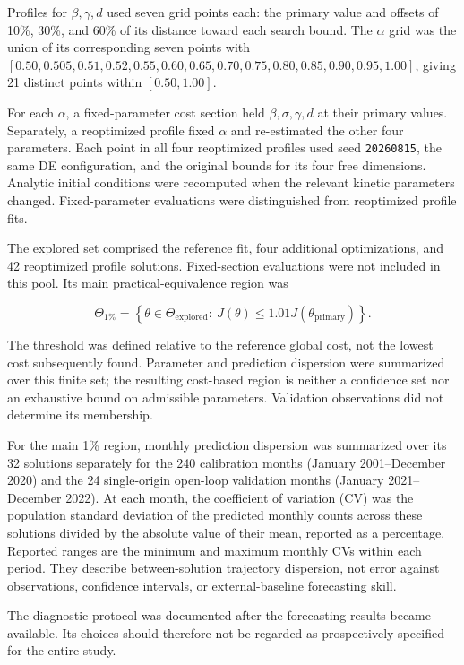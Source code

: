 \documentclass[pdflatex,sn-mathphys-ay,lineno]{sn-jnl}
\begin{document}
Profiles for $\beta,\gamma,d$ used seven grid points each: the primary value and offsets of 10\%, 30\%, and 60\% of its distance toward each search bound. The $\alpha$ grid was the union of its corresponding seven points with $[0.50,0.505,0.51,0.52,0.55,0.60,0.65,0.70,0.75,0.80,0.85,0.90,0.95,1.00]$, giving 21 distinct points within $[0.50,1.00]$.

For each $\alpha$, a fixed-parameter cost section held $\beta,\sigma,\gamma,d$ at their primary values. Separately, a reoptimized profile fixed $\alpha$ and re-estimated the other four parameters. Each point in all four reoptimized profiles used seed \texttt{20260815}, the same DE configuration, and the original bounds for its four free dimensions. Analytic initial conditions were recomputed when the relevant kinetic parameters changed. Fixed-parameter evaluations were distinguished from reoptimized profile fits.

The explored set comprised the reference fit, four additional optimizations, and 42 reoptimized profile solutions. Fixed-section evaluations were not included in this pool. Its main practical-equivalence region was

\[
\Theta_{1\%}=\left\{\theta\in\Theta_{\mathrm{explored}}:\ J(\theta)\le1.01J(\theta_{\mathrm{primary}})\right\}.
\]

The threshold was defined relative to the reference global cost, not the lowest cost subsequently found. Parameter and prediction dispersion were summarized over this finite set; the resulting cost-based region is neither a confidence set nor an exhaustive bound on admissible parameters. Validation observations did not determine its membership.

For the main 1\% region, monthly prediction dispersion was summarized over its 32 solutions separately for the 240 calibration months (January 2001--December 2020) and the 24 single-origin open-loop validation months (January 2021--December 2022). At each month, the coefficient of variation (CV) was the population standard deviation of the predicted monthly counts across these solutions divided by the absolute value of their mean, reported as a percentage. Reported ranges are the minimum and maximum monthly CVs within each period. They describe between-solution trajectory dispersion, not error against observations, confidence intervals, or external-baseline forecasting skill.

The diagnostic protocol was documented after the forecasting results became available. Its choices should therefore not be regarded as prospectively specified for the entire study.
\end{document}
